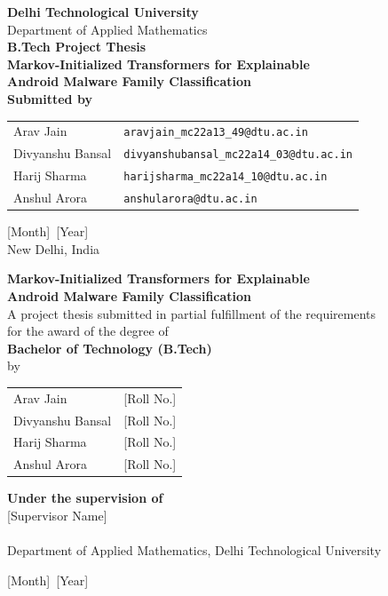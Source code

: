 \documentclass[12pt]{report}
\makeatletter
\newcommand{\thesistitle}{Markov-Initialized Transformers for Explainable\\Android Malware Family Classification}
\newcommand{\university}{Delhi Technological University}
\newcommand{\department}{Department of Applied Mathematics}
\newcommand{\degree}{Bachelor of Technology (B.Tech)}
\newcommand{\projecttype}{B.Tech Project Thesis}
\newcommand{\submissionmonth}{[Month]}
\newcommand{\submissionyear}{[Year]}
\newcommand{\place}{New Delhi, India}
\newcommand{\candidateone}{Arav Jain}
\newcommand{\candidatetwo}{Divyanshu Bansal}
\newcommand{\candidatethree}{Harij Sharma}
\newcommand{\candidatefour}{Anshul Arora}
\newcommand{\emailone}{aravjain\_mc22a13\_49@dtu.ac.in}
\newcommand{\emailtwo}{divyanshubansal\_mc22a14\_03@dtu.ac.in}
\newcommand{\emailthree}{harijsharma\_mc22a14\_10@dtu.ac.in}
\newcommand{\emailfour}{anshularora@dtu.ac.in}
\newcommand{\supervisor}{[Supervisor Name]}
\newcommand{\supervisordesignation}{[Designation]}
\makeatother
\begin{document}
\begin{titlepage}
\thispagestyle{empty}
\begin{center}
{\Large \textbf{\university}}\\[0.2cm]
{\large \department}\\[1.5cm]

{\LARGE \textbf{\projecttype}}\\[0.75cm]
{\LARGE \textbf{\thesistitle}}\\[1.5cm]

\textbf{Submitted by}\\[0.4cm]
\begin{tabular}{ll}
\candidateone & \texttt{\emailone} \\
\candidatetwo & \texttt{\emailtwo} \\
\candidatethree & \texttt{\emailthree} \\
\candidatefour & \texttt{\emailfour} \\
\end{tabular}

\vfill
{\large \submissionmonth\ \submissionyear}\\
{\large \place}
\end{center}
\end{titlepage}

\begin{titlepage}
\thispagestyle{empty}
\begin{center}
{\LARGE \textbf{\thesistitle}}\\[1cm]

A project thesis submitted in partial fulfillment of the requirements\\
for the award of the degree of\\[0.3cm]
\textbf{\degree}\\[0.6cm]
by\\[0.4cm]

\begin{tabular}{ll}
\candidateone & [Roll No.] \\
\candidatetwo & [Roll No.] \\
\candidatethree & [Roll No.] \\
\candidatefour & [Roll No.] \\
\end{tabular}

\vfill
\textbf{Under the supervision of}\\[0.2cm]
\supervisor\\
\supervisordesignation\\
\department, \university

\vfill
{\large \submissionmonth\ \submissionyear}
\end{center}
\end{titlepage}
\end{document}
